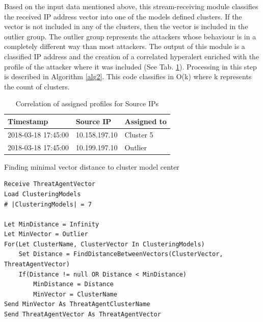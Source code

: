 \documentclass[conference, a4paper]{IEEEtran}
\begin{document}
Based on the input data mentioned above, this stream-receiving module classifies the received IP address vector into one of the models defined clusters. If the vector is not included in any of the clusters, then the vector is included in the outlier group. The outlier group represents the attackers whose behaviour is in a completely different way than most attackers. The output of this module is a classified IP address and the creation of a correlated hyperalert enriched with the profile of the attacker where it was included (See Tab. \ref{tab:assignprofile}). Processing in this step is described in Algorithm \ref{alg2}. This code classifies in O(k) where k represents the count of clusters. 

\begin{table}[h!]
    \caption{Correlation of assigned profiles for Source IPs}
    \label{tab:assignprofile}
    \centering
    \begin{tabular}{|l|l|l|}
        \hline
        \textbf{Timestamp} & \textbf{Source IP} & \textbf{Assigned to} \\ \hline \hline
        2018-03-18 17:45:00 & 10.158.197.10 & Cluster 5 \\ \hline
        2018-03-18 17:45:00 & 10.199.197.10 & Outlier \\ \hline
    \end{tabular}
\end{table}

\begin{algorithm}
\caption{Finding minimal vector distance to cluster model center}
\label{alg2}
\begin{lstlisting}
Receive ThreatAgentVector 
Load ClusteringModels 
# |ClusteringModels| = 7

Let MinDistance = Infinity 
Let MinVector = Outlier 
For(Let ClusterName, ClusterVector In ClusteringModels) 
    Set Distance = FindDistanceBetweenVectors(ClusterVector, ThreatAgentVector) 
    If(Distance != null OR Distance < MinDistance) 
        MinDistance = Distance 
        MinVector = ClusterName 
Send MinVector As ThreatAgentClusterName 
Send ThreatAgentVector As ThreatAgentVector 
\end{lstlisting}
\end{algorithm}
\end{document}
